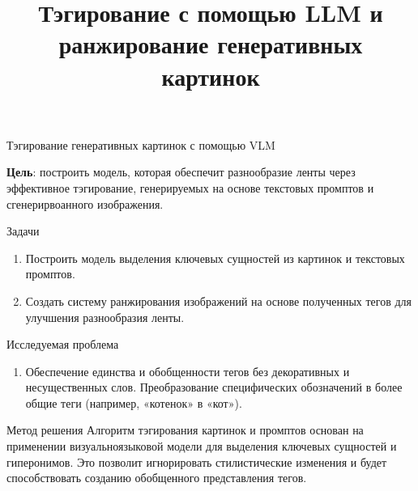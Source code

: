 \documentclass[12pt,pdf,hyperref={unicode}]{beamer}
\title{Тэгирование с помощью LLM и ранжирование генеративных картинок}
\begin{document}
\setcounter{page}{2}%

\begin{frame}{Тэгирование генеративных картинок с помощью VLM }
\tiny %

  \textbf{Цель}: построить модель, которая обеспечит разнообразие ленты через эффективное тэгирование, генерируемых на основе текстовых промптов и сгенерирвоанного изображения.
  
  \begin{block}{Задачи}
    \begin{enumerate}[1.]
      \item Построить модель выделения ключевых сущностей из картинок и текстовых промптов.
      \item Создать систему ранжирования изображений на основе полученных тегов для улучшения разнообразия ленты.
    \end{enumerate}
  \end{block}

  \begin{block}{Исследуемая проблема}
    \begin{enumerate}[1.]
      \item Обеспечение единства и обобщенности тегов без декоративных и несущественных слов. Преобразование специфических обозначений в более общие теги (например, «котенок» в «кот»).
    \end{enumerate}
  \end{block}

  \begin{block}{Метод решения}
    Алгоритм тэгирования картинок и промптов основан на применении визуальноязыковой модели для выделения ключевых сущностей и гиперонимов. Это позволит игнорировать стилистические изменения и будет способствовать созданию обобщенного представления тегов.
  \end{block}

\end{frame}
\end{document}

